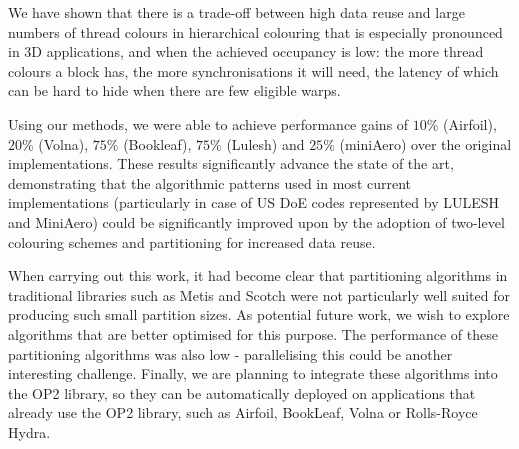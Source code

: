 We have shown that there is a trade-off between high data reuse and large
numbers of thread colours in hierarchical colouring that is especially
pronounced in 3D applications, and when the achieved occupancy is low: the more thread colours a block
has, the more synchronisations it will need, the latency of which can be hard to
hide when there are few eligible warps.

Using our methods, we were able to achieve performance gains of $10\%$
(Airfoil), $20\%$ (Volna), $75\%$ (Bookleaf), $75\%$ (Lulesh) and $25\%$
(miniAero) over the original implementations. These results significantly
advance the state of the art, demonstrating that the algorithmic patterns used
in most current implementations (particularly in case of US DoE codes
represented by LULESH and MiniAero) could be significantly improved upon by the
adoption of two-level colouring schemes and partitioning for increased data
reuse.

When carrying out this work, it had become clear that partitioning algorithms in
traditional libraries such as Metis and Scotch were not particularly well suited
for producing such small partition sizes. As potential future work, we wish to
explore algorithms that are better optimised for this purpose. The performance
of these partitioning algorithms was also low - parallelising this could be
another interesting challenge. Finally, we are planning to integrate these
algorithms into the OP2 library, so they can be automatically deployed on
applications that already use the OP2 library, such as Airfoil, BookLeaf, Volna
or Rolls-Royce Hydra.

